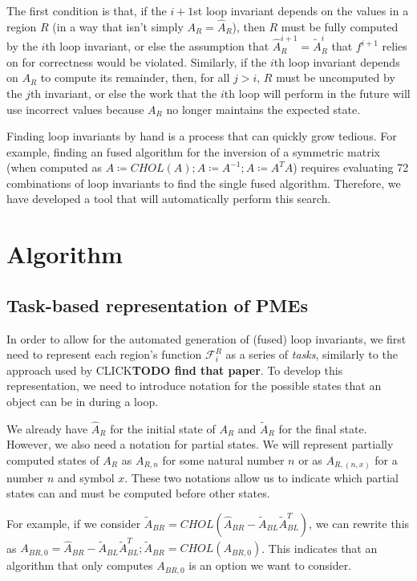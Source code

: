 \documentclass[12pt,letterpaper]{article}
\newcommand*{\opF}{\mathcal{F}}
\newcommand*{\opf}{f}
\begin{document}
The first condition is that, if the $i + 1$st loop invariant depends on the values in a region $R$ (in a way that isn't simply $A_R = \hat{A}_R$), then $R$ must be fully computed by the $i$th loop invariant, or else the assumption that $\hat{A}^{i + 1}_R = \widetilde{A}^i_R$ that $\opf^{i + 1}$ relies on for correctness would be violated.
Similarly, if the $i$th loop invariant depends on $A_R$ to compute its remainder, then, for all $j > i$, $R$ must be uncomputed by the $j$th invariant, or else the work that the $i$th loop will perform in the future will use incorrect values because $A_R$ no longer maintains the expected state.

Finding loop invariants by hand is a process that can quickly grow tedious.
For example, finding an fused algorithm for the inversion of a symmetric matrix (when computed as $A \coloneqq CHOL(A); A \coloneqq A^{-1}; A \coloneqq A^TA$) requires evaluating 72 combinations of loop invariants to find the single fused algorithm.
Therefore, we have developed a tool that will automatically perform this search.

\section{Algorithm}

\subsection{Task-based representation of PMEs}
In order to allow for the automated generation of (fused) loop invariants, we first need to represent each region's function $\opF_i^R$ as a series of \emph{tasks}, similarly to the approach used by CLICK\textbf{TODO find that paper}.
To develop this representation, we need to introduce notation for the possible states that an object can be in during a loop.

We already have $\hat{A}_R$ for the initial state of $A_R$ and $\widetilde{A}_R$ for the final state.
However, we also need a notation for partial states.
We will represent partially computed states of $A_R$ as $A_{R, n}$ for some natural number $n$ or as $A_{R, (n, x)}$ for a number $n$ and symbol $x$.
These two notations allow us to indicate which partial states can and must be computed before other states.

For example, if we consider $\widetilde{A}_{BR} = CHOL(\hat{A}_{BR} - \widetilde{A}_{BL}\widetilde{A}_{BL}^T)$, we can rewrite this as $A_{BR, 0} = \hat{A}_{BR} - \widetilde{A}_{BL}\widetilde{A}_{BL}^T; \widetilde{A}_{BR} = CHOL(A_{BR, 0})$.
This indicates that an algorithm that only computes $A_{BR, 0}$ is an option we want to consider.
\end{document}
